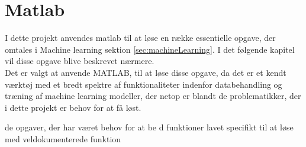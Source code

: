 \thispagestyle{fancy}
\chapter{Matlab}
\label{chp:matlabChapter}

I dette projekt anvendes matlab til at løse en række essentielle opgave, der omtales i Machine learning sektion \ref{sec:machineLearning}. I det følgende kapitel vil disse opgave blive beskrevet nærmere. \\
Det er valgt at anvende MATLAB, til at løse disse opgave, da det er et kendt værktøj med et bredt spektre af funktionaliteter indenfor databehandling og træning af machine learning modeller, der netop er blandt de problematikker, der i dette projekt er behov for at få løst. 
  
de opgaver, der har været behov for at be d
 funktioner lavet specifikt til at løse 
med veldokumenterede funktion

